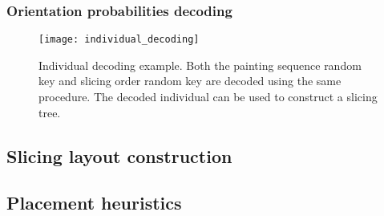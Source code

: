 \subsubsection*{Orientation probabilities decoding}



\begin{figure}[htp]
    \texttt{[image: individual\_decoding]}
    \caption{
        Individual decoding example. Both the painting sequence random key and slicing order random key
        are decoded using the same procedure. The decoded individual can be used to construct a slicing tree.
    }
    \label{fig:individual-decoding}
\end{figure}

\subsection{Slicing layout construction}\label{subsec:slicing-tree-construction}


\subsection{Placement heuristics}\label{subsec:placement-heuristics}